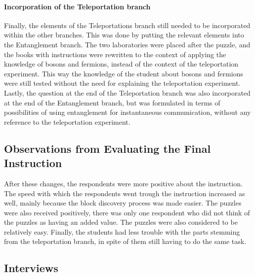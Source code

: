 \documentclass[11pt,twoside]{report} %
\begin{document}
\paragraph{Incorporation of the Teleportation branch}

Finally, the elements of the Teleportations branch still needed to be incorporated within the other branches. This was done by putting the relevant elements into the Entanglement branch. The two laboratories were placed after the puzzle, and the books with instructions were rewritten to the context of applying the knowledge of bosons and fermions, instead of the context of the teleportation experiment. This way the knowledge of the student about bosons and fermions were still tested without the need for explaining the teleportation experiment. Lastly, the question at the end of the Teleportation branch was also incorporated at the end of the Entanglement branch, but was formulated in terms of possibilities of using entanglement for instantaneous communication, without any reference to the teleportation experiment.

\subsection{Observations from Evaluating the Final Instruction}

After these changes, the respondents were more positive about the instruction. The speed with which the respondents went trough the instruction increased as well, mainly because the block discovery process was made easier. The puzzles were also received positively, there was only one respondent who did not think of the puzzles as having an added value. The puzzles were also considered to be relatively easy. Finally, the students had less trouble with the parts stemming from the teleportation branch, in spite of them still having to do the same task.

\subsection{Interviews}
\end{document}
